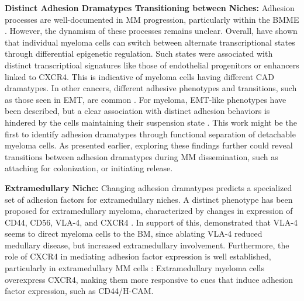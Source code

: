 \textbf{Distinct Adhesion Dramatypes Transitioning between Niches:}
Adhesion processes are well-documented in MM progression, particularly within
the \ac{BMME} \cite{bouzerdanAdhesionMoleculesMultiple2022}. However, the
dynamism of these processes remains unclear. Overall,
\citet{fredeDynamicTranscriptionalReprogramming2021} have shown that individual
myeloma cells can switch between alternate transcriptional states through
differential epigenetic regulation. Such states were associated with distinct
transcriptioal signatures like those of endothelial progenitors or enhancers
linked to CXCR4. This is indicative of myeloma cells having different \ac{CAD}
dramatypes. In other cancers, different adhesive phenotypes and transitions,
such as those seen in \ac{EMT}, are common
\cite{gengDynamicSwitchTwo2014}. For myeloma, EMT-like phenotypes have been
described, but a clear association with distinct adhesion behaviors is hindered
by the cells maintaining their suspension state
\cite{roccaroCXCR4RegulatesExtraMedullary2015,
      qianSETDB1InducesLenalidomide2023}. This work might be the first to identify
adhesion dramatypes through functional separation of detachable myeloma cells.
As presented earlier, exploring these findings further could reveal transitions
between adhesion dramatypes during MM dissemination, such as attaching for
colonization, or initiating release.


\textbf{Extramedullary Niche:}
Changing adhesion dramatypes predicts a specialized set of adhesion factors for
extramedullary niches. A distinct phenotype has been proposed for extramedullary
myeloma, characterized by changes in
expression of CD44, CD56, VLA-4, and CXCR4
\cite{guptaExtramedullaryMultipleMyeloma2022}. In support of this,
\cite{hathiAblationVLA4Multiple2022} demonstrated that VLA-4 seems to direct
myeloma cells to the BM, since ablating VLA-4 reduced medullary disease, but
increased extramedullary involvement. Furthermore, the role of CXCR4 in
mediating adhesion factor expression is well established, particularly in
extramedullary MM cells \cite{roccaroCXCR4RegulatesExtraMedullary2015,
      guptaExtramedullaryMultipleMyeloma2022}: Extramedullary myeloma cells
overexpress CXCR4, making them more responsive to cues that induce adhesion
factor expression, such as CD44/H-CAM.



